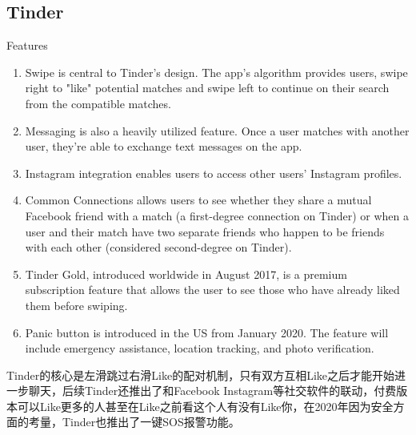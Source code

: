 \documentclass[UTF8]{ctexart}
\begin{document}
\subsection{Tinder}

\begin{tcolorbox}
    Features
    \begin{enumerate}
        \item Swipe is central to Tinder's design. The app's algorithm provides users, swipe right to "like" potential matches and swipe left to continue on their search from the compatible matches.
        \item Messaging is also a heavily utilized feature. Once a user matches with another user, they're able to exchange text messages on the app.
        \item Instagram integration enables users to access other users' Instagram profiles.
        \item Common Connections allows users to see whether they share a mutual Facebook friend with a match (a first-degree connection on Tinder) or when a user and their match have two separate friends who happen to be friends with each other (considered second-degree on Tinder).
        \item Tinder Gold, introduced worldwide in August 2017, is a premium subscription feature that allows the user to see those who have already liked them before swiping.
        \item Panic button is introduced in the US from January 2020. The feature will include emergency assistance, location tracking, and photo verification.\cite{WikiTinderFeatures}
    \end{enumerate}
\end{tcolorbox}

Tinder的核心是左滑跳过右滑Like的配对机制，只有双方互相Like之后才能开始进一步聊天，后续Tinder还推出了和Facebook Instagram等社交软件的联动，付费版本可以Like更多的人甚至在Like之前看这个人有没有Like你，在2020年因为安全方面的考量，Tinder也推出了一键SOS报警功能。
\end{document}
